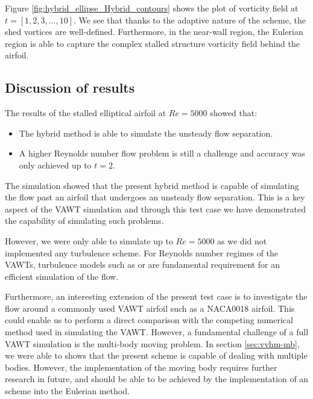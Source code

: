 
Figure \ref{fig:hybrid_ellipse_Hybrid_contours} shows the plot of vorticity field at $t=[1,2,3,...,10]$. We see that thanks to the adaptive nature of the scheme, the shed vortices are well-defined. Furthermore, in the near-wall region, the Eulerian region is able to capture the complex stalled structure vorticity field behind the airfoil.
	

	
\subsection{Discussion of results}	

The results of the stalled elliptical airfoil at $Re=5000$ showed that:
\begin{itemize}
\item The hybrid method is able to simulate the unsteady flow separation.
\item A higher Reynolds number flow problem is still a challenge and accuracy was only achieved up to $t=2$.
\end{itemize}

The simulation showed that the present hybrid method is capable of simulating the flow past an airfoil that undergoes an unsteady flow separation. This is a key aspect of the VAWT simulation and through this test case we have demonstrated the capability of simulating such problems.

However, we were only able to simulate up to $Re=5000$ as we did not implemented any turbulence scheme. For Reynolds number regimes of the VAWTs, turbulence models such as  or  are fundamental requirement for an efficient simulation of the flow.

Furthermore, an interesting extension of the present test case is to investigate the flow around a commonly used VAWT airfoil such as a NACA0018 airfoil. This could enable us to perform a direct comparison with the competing numerical method used in simulating the VAWT. However, a fundamental challenge of a full VAWT simulation is the multi-body moving problem. In section \ref{sec:vvhm-mb}, we were able to shows that the present scheme is capable of dealing with multiple bodies. However, the implementation of the moving body requires further research in future, and should be able to be achieved by the implementation of an  scheme into the Eulerian method.

